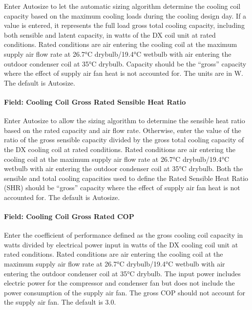 Enter Autosize to let the automatic sizing algorithm determine the cooling coil capacity based on the maximum cooling loads during the cooling design day. If a value is entered, it represents the full load gross total cooling capacity, including both sensible and latent capacity, in watts of the DX coil unit at rated conditions. Rated conditions are air entering the cooling coil at the maximum supply air flow rate at 26.7°C drybulb/19.4°C wetbulb with air entering the outdoor condenser coil at 35°C drybulb. Capacity should be the ``gross'' capacity where the effect of supply air fan heat is not accounted for. The units are in W. The default is Autosize.

\paragraph{Field: Cooling Coil Gross Rated Sensible Heat Ratio}\label{field-cooling-coil-gross-rated-sensible-heat-ratio-5}

Enter Autosize to allow the sizing algorithm to determine the sensible heat ratio based on the rated capacity and air flow rate. Otherwise, enter the value of the ratio of the gross sensible capacity divided by the gross total cooling capacity of the DX cooling coil at rated conditions. Rated conditions are air entering the cooling coil at the maximum supply air flow rate at 26.7°C drybulb/19.4°C wetbulb with air entering the outdoor condenser coil at 35°C drybulb. Both the sensible and total cooling capacities used to define the Rated Sensible Heat Ratio (SHR) should be ``gross'' capacity where the effect of supply air fan heat is not accounted for. The default is Autosize.

\paragraph{Field: Cooling Coil Gross Rated COP}\label{field-cooling-coil-gross-rated-cop-3}

Enter the coefficient of performance defined as the gross cooling coil capacity in watts divided by electrical power input in watts of the DX cooling coil unit at rated conditions. Rated conditions are air entering the cooling coil at the maximum supply air flow rate at 26.7°C drybulb/19.4°C wetbulb with air entering the outdoor condenser coil at 35°C drybulb. The input power includes electric power for the compressor and condenser fan but does not include the power consumption of the supply air fan. The gross COP should not account for the supply air fan. The default is 3.0.

